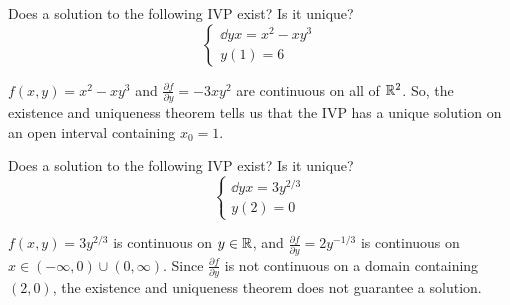 \begin{example}
	Does a solution to the following IVP exist? Is it unique?
	\begin{equation*}
		\begin{cases}
			\dd{y}{x} = x^2 - xy^3 \\
			y(1) = 6
		\end{cases}
	\end{equation*}
\end{example}
\noindent
$f(x,y) = x^2 - xy^3$ and $\frac{\partial f}{\partial y} = -3xy^2$ are continuous on all of $\mathbb{R}^2$. So, the existence and uniqueness theorem tells us that the IVP has a unique solution on an open interval containing $x_0 = 1$.

\begin{example}
	Does a solution to the following IVP exist? Is it unique?
	\begin{equation*}
	\begin{cases}
		\dd{y}{x} = 3y^{2/3} \\
		y(2) = 0
	\end{cases}
	\end{equation*}
\end{example}
\noindent
$f(x,y) = 3y^{2/3}$ is continuous on $y \in \mathbb{R}$, and $\frac{\partial f}{\partial y} = 2y^{-1/3}$ is continuous on $x \in \left(-\infty, 0\right) \cup \left(0, \infty\right)$. Since $\frac{\partial f}{\partial y}$ is not continuous on a domain containing $(2,0)$, the existence and uniqueness theorem does not guarantee a solution.